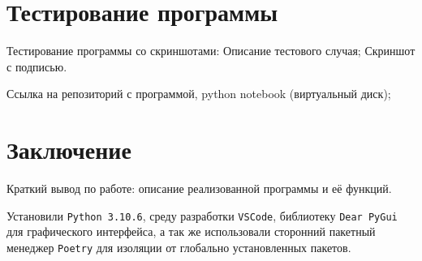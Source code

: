 \section{Тестирование программы}
Тестирование программы со скриншотами: Описание тестового случая; Скриншот с подписью.

Ссылка на репозиторий с программой, python notebook (виртуальный диск);

\section*{Заключение}
Краткий вывод по работе: описание реализованной программы и её функций.

Установили \verb|Python 3.10.6|, среду разработки \verb|VSCode|, библиотеку
\verb|Dear PyGui| для графического интерфейса, а так же использовали сторонний
пакетный менеджер \verb|Poetry| для изоляции от глобально установленных пакетов.
